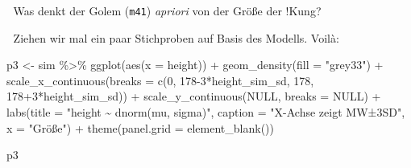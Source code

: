 \documentclass[
  a4paper,
  DIV=11]{scrreprt}
\newenvironment{Shaded}{\begin{snugshade}}{\end{snugshade}}
\newcommand{\AttributeTok}[1]{\textcolor[rgb]{0.40,0.45,0.13}{#1}}
\newcommand{\ConstantTok}[1]{\textcolor[rgb]{0.56,0.35,0.01}{#1}}
\newcommand{\DecValTok}[1]{\textcolor[rgb]{0.68,0.00,0.00}{#1}}
\newcommand{\FloatTok}[1]{\textcolor[rgb]{0.68,0.00,0.00}{#1}}
\newcommand{\FunctionTok}[1]{\textcolor[rgb]{0.28,0.35,0.67}{#1}}
\newcommand{\NormalTok}[1]{\textcolor[rgb]{0.00,0.23,0.31}{#1}}
\newcommand{\OtherTok}[1]{\textcolor[rgb]{0.00,0.23,0.31}{#1}}
\newcommand{\SpecialCharTok}[1]{\textcolor[rgb]{0.37,0.37,0.37}{#1}}
\newcommand{\StringTok}[1]{\textcolor[rgb]{0.13,0.47,0.30}{#1}}
\theoremstyle{definition}
\theoremstyle{remark}
\begin{document}
\begin{Shaded}
\end{Shaded}

💭 Was denkt der Golem (\texttt{m41}) \emph{apriori} von der Größe der
!Kung?

🦾 Ziehen wir mal ein paar Stichproben auf Basis des Modells. Voilà:

\begin{Shaded}
\begin{Highlighting}[]
\NormalTok{p3 }\OtherTok{\textless{}{-}} 
\NormalTok{  sim }\SpecialCharTok{\%\textgreater{}\%} 
  \FunctionTok{ggplot}\NormalTok{(}\FunctionTok{aes}\NormalTok{(}\AttributeTok{x =}\NormalTok{ height)) }\SpecialCharTok{+}
  \FunctionTok{geom\_density}\NormalTok{(}\AttributeTok{fill =} \StringTok{"grey33"}\NormalTok{) }\SpecialCharTok{+}
  \FunctionTok{scale\_x\_continuous}\NormalTok{(}\AttributeTok{breaks =} \FunctionTok{c}\NormalTok{(}\DecValTok{0}\NormalTok{, }\DecValTok{178{-}3}\SpecialCharTok{*}\NormalTok{height\_sim\_sd, }\DecValTok{178}\NormalTok{, }\DecValTok{178}\SpecialCharTok{+}\DecValTok{3}\SpecialCharTok{*}\NormalTok{height\_sim\_sd)) }\SpecialCharTok{+}
  \FunctionTok{scale\_y\_continuous}\NormalTok{(}\ConstantTok{NULL}\NormalTok{, }\AttributeTok{breaks =} \ConstantTok{NULL}\NormalTok{) }\SpecialCharTok{+}
  \FunctionTok{labs}\NormalTok{(}\AttributeTok{title =} \StringTok{"height \textasciitilde{} dnorm(mu, sigma)"}\NormalTok{,}
       \AttributeTok{caption =} \StringTok{"X{-}Achse zeigt MW±3SD"}\NormalTok{,}
       \AttributeTok{x =} \StringTok{"Größe"}\NormalTok{) }\SpecialCharTok{+}
  \FunctionTok{theme}\NormalTok{(}\AttributeTok{panel.grid =} \FunctionTok{element\_blank}\NormalTok{()) }

\NormalTok{p3}
\end{Highlighting}
\end{Shaded}
\end{document}
